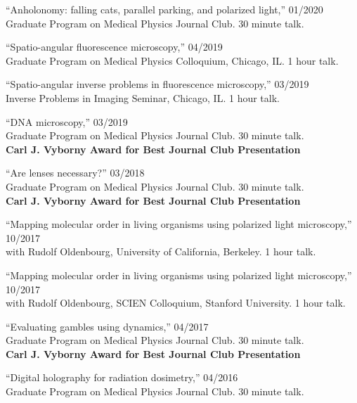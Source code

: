 \documentclass[12pt,letterpaper]{article}
\begin{document}
\begin{benumerate}{9}
\item {``Anholonomy: falling cats, parallel parking, and polarized light,'' \hfill 01/2020\\Graduate Program on Medical Physics Journal Club. 30 minute talk.}
  
\item {``Spatio-angular fluorescence microscopy,'' \hfill 04/2019\\
     Graduate Program on Medical Physics Colloquium, Chicago, IL. 1 hour talk.}
  
\item {``Spatio-angular inverse problems in fluorescence microscopy,'' \hfill 03/2019\\
     Inverse Problems in Imaging Seminar, Chicago, IL. 1 hour talk.}

\item {``DNA microscopy,'' \hfill 03/2019\\
    Graduate Program on Medical Physics Journal Club. 30 minute talk.\\
    \textbf{Carl J. Vyborny Award for Best Journal Club Presentation}}
  
\item {``Are lenses necessary?'' \hfill 03/2018\\
    Graduate Program on Medical Physics Journal Club. 30 minute talk.\\
    \textbf{Carl J. Vyborny Award for Best Journal Club Presentation}}
  
\item {``Mapping molecular order in living organisms using polarized light microscopy,'' \hfill 10/2017\\
    with Rudolf Oldenbourg, University of California, Berkeley. 1 hour talk.}
  
\item {``Mapping molecular order in living organisms using polarized light microscopy,'' \hfill 10/2017\\
    with Rudolf Oldenbourg, SCIEN Colloquium, Stanford University. 1 hour talk.}
  
\item {``Evaluating gambles using dynamics,'' \hfill 04/2017\\
    Graduate Program on Medical Physics Journal Club. 30 minute talk.\\
    \textbf{Carl J. Vyborny Award for Best Journal Club Presentation}}

\item {``Digital holography for radiation dosimetry,'' \hfill 04/2016\\
    Graduate Program on Medical Physics Journal Club. 30 minute talk.}
\end{benumerate}
\end{document}
